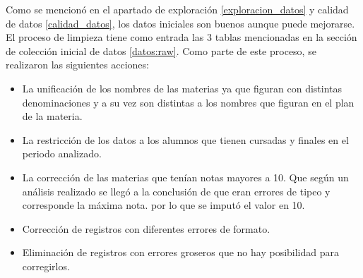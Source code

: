 
Como se mencionó en el apartado de exploración \ref{exploracion_datos} y calidad de datos \ref{calidad_datos}, los datos iniciales son buenos aunque puede mejorarse.\\
El proceso de limpieza tiene como entrada las 3 tablas mencionadas en la sección de colección inicial de datos \ref{datos:raw}. Como parte de este proceso, se realizaron las siguientes acciones:
\begin{itemize}
\item La unificación de los nombres de las materias ya que figuran con distintas denominaciones y a su vez son distintas a los nombres que figuran en el plan de la materia.
\item La restricción de los datos a los alumnos que tienen cursadas y finales en el periodo analizado. 
\item La corrección de las materias que tenían notas mayores a 10. Que según un análisis realizado se llegó a la conclusión de que eran errores de tipeo y corresponde la máxima nota. por lo que se imputó el valor en 10. 
\item Corrección de registros con diferentes errores de formato.
\item Eliminación de registros con errores groseros que no hay posibilidad para corregirlos.
\end{itemize}




